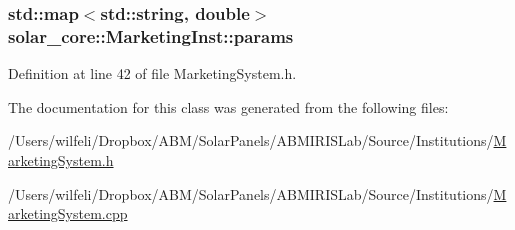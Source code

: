 \subsubsection[{params}]{\setlength{\rightskip}{0pt plus 5cm}std\+::map$<$std\+::string, double$>$ solar\+\_\+core\+::\+Marketing\+Inst\+::params\hspace{0.3cm}{\ttfamily [protected]}}\label{classsolar__core_1_1_marketing_inst_a58a4f5acc2492edebfde65bee94802b9}


Definition at line 42 of file Marketing\+System.\+h.



The documentation for this class was generated from the following files\+:\begin{DoxyCompactItemize}
\item 
/\+Users/wilfeli/\+Dropbox/\+A\+B\+M/\+Solar\+Panels/\+A\+B\+M\+I\+R\+I\+S\+Lab/\+Source/\+Institutions/\hyperlink{_marketing_system_8h}{Marketing\+System.\+h}\item 
/\+Users/wilfeli/\+Dropbox/\+A\+B\+M/\+Solar\+Panels/\+A\+B\+M\+I\+R\+I\+S\+Lab/\+Source/\+Institutions/\hyperlink{_marketing_system_8cpp}{Marketing\+System.\+cpp}\end{DoxyCompactItemize}
